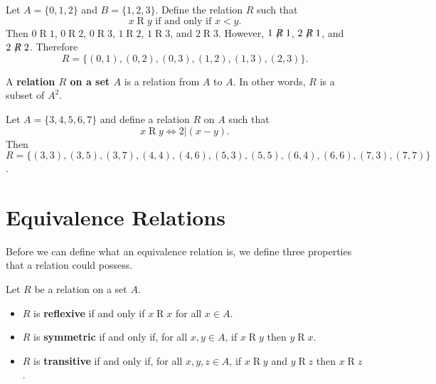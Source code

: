 \begin{example}
    Let $A = \{0, 1, 2\}$ and $B = \{1, 2, 3\}$. Define the relation $R$ such that
    \[
        x\mathrel{R}y \text{ if and only if } x < y.
    \]
    Then $0\mathrel{R}1$, $0\mathrel{R}2$, $0\mathrel{R}3$, $1\mathrel{R}2$, $1\mathrel{R}3$, and $2\mathrel{R}3$. However, $1\not\mathrel{R}1$, $2\not\mathrel{R}1$, and $2\not\mathrel{R}2$. Therefore
    \[
        R = \{(0, 1), (0, 2), (0, 3), (1, 2), (1, 3), (2, 3)\}.
    \]
\end{example}

\begin{definition}
    A \textbf{relation $R$ on a set $A$} is a relation from $A$ to $A$. In other words, $R$ is a subset of $A^2$.
\end{definition}
\begin{example}
    Let $A = \{3, 4, 5, 6, 7\}$ and define a relation $R$ on $A$ such that
    \[
        x\mathrel{R}y \iff 2 \vert (x-y).
    \]
    Then $R = \{(3, 3), (3, 5), (3, 7), (4, 4), (4, 6), (5, 3), (5, 5), (6, 4), (6, 6), (7, 3), (7, 7)\}$.
\end{example}

\section{Equivalence Relations}
Before we can define what an equivalence relation is, we define three properties that a relation could possess.

\begin{definition}
    Let $R$ be a relation on a set $A$.
    \begin{itemize}
        \item $R$ is \textbf{reflexive} if and only if $x\mathrel{R}x$ for all $x \in A$.
        \item $R$ is \textbf{symmetric} if and only if, for all $x, y \in A$, if $x\mathrel{R}y$ then $y\mathrel{R}x$.
        \item $R$ is \textbf{transitive} if and only if, for all $x,y,z\in A$, if $x\mathrel{R}y$ and $y\mathrel{R}z$ then $x\mathrel{R}z$.
    \end{itemize}
\end{definition}

